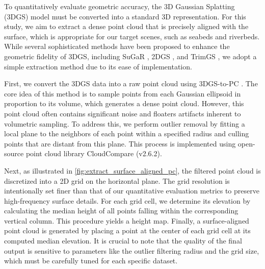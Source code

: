 To quantitatively evaluate geometric accuracy, the 3D Gaussian Splatting (3DGS) model must be converted into a standard 3D representation. 
For this study, we aim to extract a dense point cloud that is precisely aligned with the surface, which is appropriate for our target scenes, such as seabeds and riverbeds.
While several sophisticated methods have been proposed to enhance the geometric fidelity of 3DGS, including SuGaR \parencite{Gu2024CVPR_SuGaR}, 2DGS \parencite{Huang2024SIGGRAPH_2DGS}, and TrimGS \parencite{fan2024_trimGS}, we adopt a simple extraction method due to its ease of implementation.

First, we convert the 3DGS data into a raw point cloud using 3DGS-to-PC \parencite{stuart20253dgstopcconvert3dgaussian}. 
The core idea of this method is to sample points from each Gaussian ellipsoid in proportion to its volume, which generates a dense point cloud. 
However, this point cloud often contains significant noise and floaters artifacts inherent to volumetric sampling. 
To address this, we perform outlier removal by fitting a local plane to the neighbors of each point within a specified radius and culling points that are distant from this plane. 
This process is implemented using open-source point cloud library CloudCompare \parencite{girardeau2016cloudcompare} (v2.6.2).

Next, as illustrated in \cref{fig:extract_surface_aligned_pc}, the filtered point cloud is discretized into a 2D grid on the horizontal plane.
The grid resolution is intentionally set finer than that of our quantitative evaluation metrics to preserve high-frequency surface details. 
For each grid cell, we determine its elevation by calculating the median height of all points falling within the corresponding vertical column. 
This procedure yields a height map. 
Finally, a surface-aligned point cloud is generated by placing a point at the center of each grid cell at its computed median elevation. 
It is crucial to note that the quality of the final output is sensitive to parameters like the outlier filtering radius and the grid size, which must be carefully tuned for each specific dataset.


